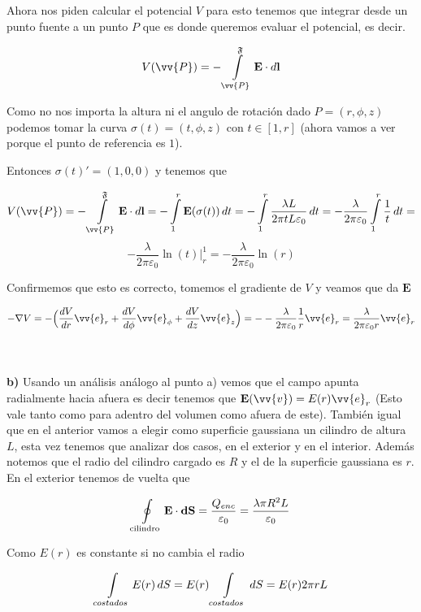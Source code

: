 \documentclass[leqno, 12pt, twoside, letterpaper]{book}
\def\efield{\textbf{E}}
\def\vdiff{\textbf{dS}}
\def\lineInt#1#2#3{\int\displaylimits_{#2}^{#3} #1 \cdot d\textbf{l}}
\begin{document}
Ahora nos piden calcular el potencial $V$ para esto tenemos que integrar desde un punto fuente a un punto $P$ que es donde queremos evaluar el potencial, es decir.

\[ V(\vv{P}) = -\lineInt{\efield}{\vv{P}}{\mathfrak{F}}  \] 

Como no nos importa la altura ni el angulo de rotación dado $P = (r, \phi, z)$ podemos tomar la curva $\sigma(t) = (t, \phi, z)$ con $t \in [1, r]$ (ahora vamos a ver porque el punto de referencia es $1$).

Entonces $\sigma(t)' = (1, 0, 0)$ y tenemos que


$$ V(\vv{P}) = -\lineInt{\efield}{\vv{P}}{\mathfrak{F}} = - \int\displaylimits_{1}^{r} \efield(\sigma(t)) \, dt  
=  - \int\displaylimits_{1}^{r} \dfrac{\lambda L}{2\pi t L \varepsilon_0} \, dt 
=  - \dfrac{\lambda }{2\pi  \varepsilon_0} \int\displaylimits_{1}^{r} \dfrac{1}{t} \, dt = $$
$$ - \dfrac{\lambda }{2\pi  \varepsilon_0} \ln(t) \Big\rvert_{r}^{1} = - \dfrac{\lambda }{2\pi  \varepsilon_0} \ln(r) 
$$ 

Confirmemos que esto es correcto, tomemos el gradiente de $V$ y veamos que da $\efield$

$$ - \nabla V = - \Big(\dfrac{dV}{dr} \vv{e}_r + \dfrac{dV}{d\phi} \vv{e}_{\phi} + \dfrac{dV}{dz} \vv{e}_z\Big) = - - \dfrac{\lambda}{2\pi \varepsilon_0} \dfrac{1}{r} \vv{e}_r =  \dfrac{\lambda}{2\pi \varepsilon_0 r} \vv{e}_r $$

\hfill\\
\hfill\\
\textbf{b)} Usando un análisis análogo al punto a) vemos que el campo apunta radialmente hacia afuera es decir tenemos que $\efield(\vv{v}) = E(r) \vv{e}_r$ (Esto vale tanto como para adentro del volumen como afuera de este). También igual que en el anterior vamos a elegir como superficie gaussiana un cilindro de altura $L$, esta vez tenemos que analizar dos casos, en el exterior y en el interior. Además notemos que el radio del cilindro cargado es $R$ y el de la superficie gaussiana es $r$. 
\hfill\\

En el exterior tenemos de vuelta que  

\[ \oint\displaylimits_{\textrm{cilindro}} \efield \cdot \vdiff = \dfrac{Q_{enc}}{\varepsilon_0} = \dfrac{\lambda\pi R^2 L}{\varepsilon_0} \]

Como $E(r)$ es constante si no cambia el radio

\[ \int\displaylimits_{costados} E(r) \, dS = E(r) \int\displaylimits_{costados}  \, dS = E(r) 2 \pi r L\]
\end{document}
